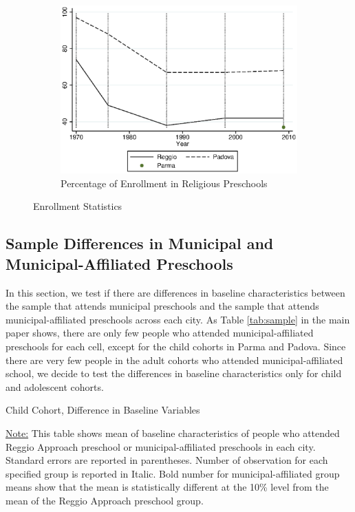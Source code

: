 \begin{figure}[H]
\begin{subfigure}[ht]{0.48\textwidth}
        \includegraphics[width=\textwidth]{output/image/enroll_per_priv_graph.eps}
        \caption{Percentage of Enrollment in Religious Preschools}
        \label{fig:large}
      \end{subfigure}
      \caption{Enrollment Statistics}  \label{fig:enrollment}
    \end{figure}


\subsection{Sample Differences in Municipal and Municipal-Affiliated Preschools}

In this section, we test if there are differences in baseline characteristics between the sample that attends municipal preschools and the sample that attends municipal-affiliated preschools across each city. As Table \ref{tab:sample} in the main paper shows, there are only few people who attended municipal-affiliated preschools for each cell, except for the child cohorts in Parma and Padova. Since there are very few people in the adult cohorts who attended municipal-affiliated school, we decide to test the differences in baseline characteristics only for child and adolescent cohorts.

\begin{table}[H] \caption{Child Cohort, Difference in Baseline Variables} \label{apptab:munivsaffi-child}
	\scalebox{0.8}{
	}
\footnotesize\raggedright{\underline{Note:} This table shows mean of baseline characteristics of people who attended Reggio Approach preschool or municipal-affiliated preschools in each city. Standard errors are reported in parentheses. Number of observation for each specified group is reported in Italic. Bold number for municipal-affiliated group means show that the mean is statistically different at the 10\% level from the mean of the Reggio Approach preschool group.}

\end{table}


